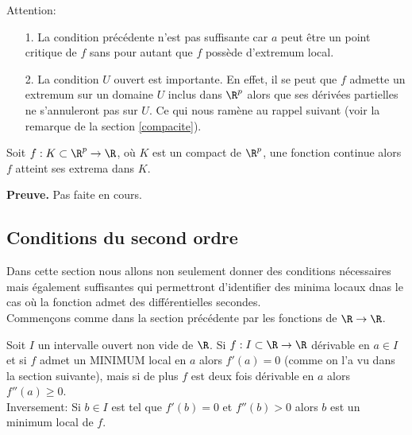 \documentclass[class=report,crop=false]{standalone}
\begin{document}
\begin{remarque*}
\textcolor[rgb]{0.00,0.00,1.00}{
  Attention: 
  \begin{itemize}
  \item[1.]La condition précédente n'est pas suffisante car 
  $a$ peut être un point critique de $f$ sans pour autant que $f$ possède d'extremum local. 
  \item[2.] La condition $U$ ouvert est importante. En effet, il se peut 
  que $f$ admette un extremum sur un domaine $U$ inclus dans $\R^p$
  alors que ses dérivées partielles ne s'annuleront pas sur $U$. Ce qui nous ramène au rappel suivant (voir la remarque de la section \ref{compacite}).
  \end{itemize}}
  \end{remarque*}
  


\begin{proposition}
\textcolor[rgb]{0.44,0.00,0.87}{
  Soit $f:K\subset \R^p \rightarrow \R$, où $K$ est un compact de $\R^p$, une fonction continue alors $f$ atteint ses extrema dans $K$.}
\end{proposition}



{\textbf{Preuve.}} Pas faite en cours.

\subsection{Conditions du second ordre}

\noindent Dans cette section nous allons non seulement donner des conditions nécessaires mais également suffisantes qui permettront
d'identifier des minima locaux dnas le cas où la fonction admet des différentielles secondes.\\
$ $
\\
Commençons comme dans la section précédente par les fonctions de $\R \rightarrow \R$.


\begin{proposition}
\textcolor[rgb]{0.44,0.00,0.87}{
 Soit $I$ un intervalle ouvert non vide de $\R$. Si $f: I \subset \R \rightarrow \R$ dérivable en $a \in I$
et si $f$ admet un MINIMUM local en $a$ alors $f'(a)=0$ (comme on l'a vu dans la section suivante), mais si de plus $f$ est deux fois 
dérivable en $a$ alors $f''(a) \geq 0$.\\
Inversement: Si $b \in I$ est tel que $f'(b)=0$ et $f''(b)>0$ alors $b$ est un minimum  local de $f$. }
\end{proposition}
\end{document}
